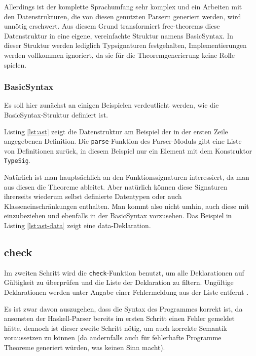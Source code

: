 \documentclass[11pt]{article} %
\begin{document}
Allerdings ist der komplette Sprachumfang sehr komplex und ein Arbeiten mit den Datenstrukturen, die von diesen genutzten Parsern generiert werden,
wird unnötig erschwert. Aus diesem Grund transformiert free-theorems diese Datenstruktur in eine eigene, vereinfachte Struktur namens BasicSyntax. In dieser Struktur
werden lediglich Typsignaturen festgehalten, Implementierungen werden vollkommen ignoriert, da sie für die Theoremgenerierung keine Rolle spielen.

\subsubsection{BasicSyntax}

Es soll hier zunächst an einigen Beispielen verdeutlicht werden, wie die BasicSyntax-Struktur definiert ist.



Listing \ref{lst:ast} zeigt die Datenstruktur am Beispiel der in der ersten Zeile angegebenen Definition. Die \texttt{parse}-Funktion des Parser-Moduls gibt eine Liste von Definitionen zurück, in diesem Beispiel nur ein Element mit dem Konstruktor \texttt{TypeSig}.

Natürlich ist man hauptsächlich an den Funktionssignaturen interessiert, da man aus diesen die Theoreme ableitet. Aber natürlich können diese Signaturen ihrerseits wiederum 
selbst definierte Datentypen oder auch Klasseneinschränkungen enthalten. Man kommt also nicht umhin, auch diese mit einzubeziehen und ebenfalls in der BasicSyntax vorzusehen.
Das Beispiel in Listing \ref{lst:ast-data} zeigt eine data-Deklaration.



\subsection{check}
\label{sec:check}

Im zweiten Schritt wird die \texttt{check}-Funktion benutzt, um alle Deklarationen auf Gültigkeit zu überprüfen und die Liste der Deklaration zu filtern. Ungültige Deklarationen
werden unter Angabe einer Fehlermeldung aus der Liste entfernt \cite{freetheorems}.

Es ist zwar davon auszugehen, dass die Syntax des Programmes korrekt ist, da ansonsten der Haskell-Parser bereits im ersten Schritt einen Fehler gemeldet hätte, dennoch ist
dieser zweite Schritt nötig, um auch korrekte Semantik voraussetzen zu können  (da andernfalls auch für fehlerhafte Programme Theoreme generiert würden, was keinen Sinn macht).
\end{document}
